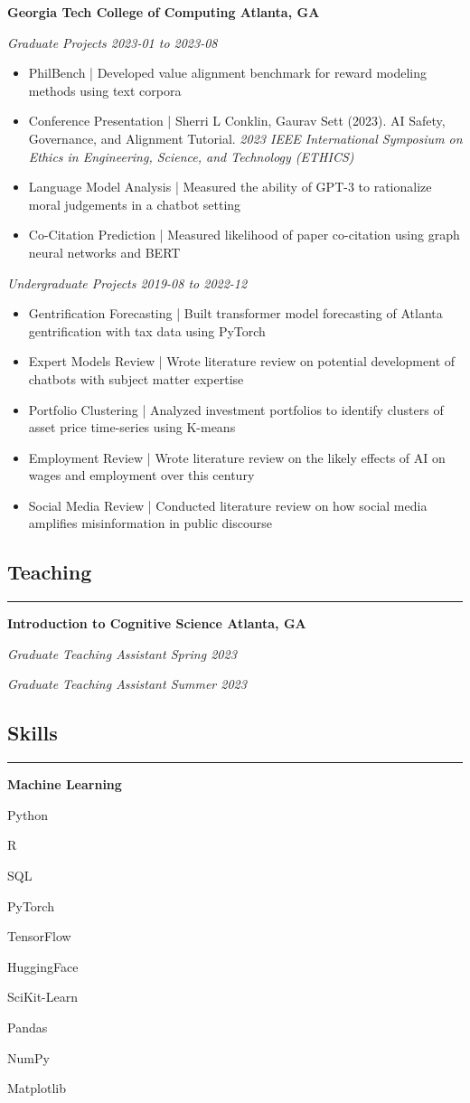 \documentclass{article}
\newcommand{\headingOne}[1]{
    \subsection*{#1} \hrule
    \vspace*{6pt}
}
\newcommand{\headingTwo}[2]{
    \vspace*{6pt}
    \textbf{#1 \hfill #2}
}
\newcommand{\headingThree}[2]{
    \vspace*{2pt}
    \textsl{#1 \hfill #2}
}
\newcommand{\headingList}[1]{\vspace*{5pt}\textbf{#1}}
\begin{document}
\headingTwo{Georgia Tech College of Computing}{Atlanta, GA}

\headingThree{Graduate Projects}{2023-01 to 2023-08}
\begin{itemize}
    \item PhilBench | Developed value alignment benchmark for reward modeling methods using text corpora
    \item Conference Presentation | Sherri L Conklin, Gaurav Sett (2023). AI Safety, Governance, and Alignment Tutorial. \textit{2023 IEEE International Symposium on Ethics in Engineering, Science, and Technology (ETHICS)}
    \item Language Model Analysis | Measured the ability of GPT-3 to rationalize moral judgements in a chatbot setting
    \item Co-Citation Prediction | Measured likelihood of paper co-citation using graph neural networks and BERT
\end{itemize}

\headingThree{Undergraduate Projects}{2019-08 to 2022-12}
\begin{itemize}
    \item Gentrification Forecasting | Built transformer model forecasting of Atlanta gentrification with tax data using PyTorch
    \item Expert Models Review | Wrote literature review on potential development of chatbots with subject matter expertise
    \item Portfolio Clustering | Analyzed investment portfolios to identify clusters of asset price time-series using K-means
    \item Employment Review | Wrote literature review on the likely effects of AI on wages and employment over this century
    \item Social Media Review | Conducted literature review on how social media amplifies misinformation in public discourse
\end{itemize}



\headingOne{Teaching}


\headingTwo{Introduction to Cognitive Science}{Atlanta, GA}

\headingThree{Graduate Teaching Assistant}{Spring 2023}

\headingThree{Graduate Teaching Assistant}{Summer 2023}


\headingOne{Skills}

\headingList{Machine Learning}
\begin{itemize*}[label=$|$]
    \item Python
    \item R
    \item SQL
    \item PyTorch
    \item TensorFlow
    \item HuggingFace
    \item SciKit-Learn
    \item Pandas
    \item NumPy
    \item Matplotlib
\end{itemize*}
\end{document}
